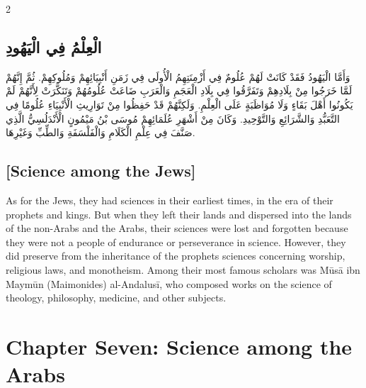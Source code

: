 \documentclass[11pt,a4paper]{article}
\newcommand{\ar}[1]{\arabicfont\beginR #1\endR}
\begin{document}
\begin{paracol}{2}
\sloppy

\begin{leftcolumn}
\subsection*{\ar{الْعِلْمُ فِي الْيَهُودِ}}
\vspace{0.3cm}
{\arabicfont\beginR
وَأَمَّا الْيَهُودُ فَقَدْ كَانَتْ لَهُمْ عُلُومٌ فِي أَزْمِنَتِهِمُ الْأُولَى فِي زَمَنِ أَنْبِيَائِهِمْ وَمُلُوكِهِمْ. ثُمَّ إِنَّهُمْ لَمَّا خَرَجُوا مِنْ بِلَادِهِمْ وَتَفَرَّقُوا فِي بِلَادِ الْعَجَمِ وَالْعَرَبِ ضَاعَتْ عُلُومُهُمْ وَتَنَكَّرَتْ لِأَنَّهُمْ لَمْ يَكُونُوا أَهْلَ بَقَاءٍ وَلَا مُوَاظَبَةٍ عَلَى الْعِلْمِ. وَلَكِنَّهُمْ قَدْ حَفِظُوا مِنْ تَوَارِيثِ الْأَنْبِيَاءِ عُلُومًا فِي التَّعَبُّدِ وَالشَّرَائِعِ وَالتَّوْحِيدِ. وَكَانَ مِنْ أَشْهَرِ عُلَمَائِهِمْ مُوسَى بْنُ مَيْمُونٍ الْأَنْدَلُسِيُّ الَّذِي صَنَّفَ فِي عِلْمِ الْكَلَامِ وَالْفَلْسَفَةِ وَالطِّبِّ وَغَيْرِهَا.
\endR}
\end{leftcolumn}

\begin{rightcolumn}
\subsection*{[Science among the Jews]}
\vspace{0.3cm}
As for the Jews, they had sciences in their earliest times, in the era of their prophets and kings. But when they left their lands and dispersed into the lands of the non-Arabs and the Arabs, their sciences were lost and forgotten because they were not a people of endurance or perseverance in science. However, they did preserve from the inheritance of the prophets sciences concerning worship, religious laws, and monotheism. Among their most famous scholars was M\={u}s\={a} ibn Maym\={u}n (Maimonides) al-Andalus\={i}, who composed works on the science of theology, philosophy, medicine, and other subjects.
\end{rightcolumn}

\end{paracol}

\clearpage

\section*{Chapter Seven: Science among the Arabs}
\end{document}
